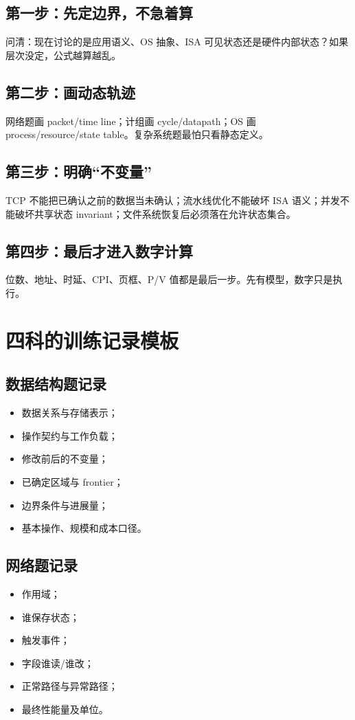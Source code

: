 \documentclass[11pt,a4paper,openany]{ctexbook}
\begin{document}
\subsection{第一步：先定边界，不急着算}
问清：现在讨论的是应用语义、OS 抽象、ISA 可见状态还是硬件内部状态？如果层次没定，公式越算越乱。

\subsection{第二步：画动态轨迹}
网络题画 packet/time line；计组画 cycle/datapath；OS 画 process/resource/state table。复杂系统题最怕只看静态定义。

\subsection{第三步：明确“不变量”}
TCP 不能把已确认之前的数据当未确认；流水线优化不能破坏 ISA 语义；并发不能破坏共享状态 invariant；文件系统恢复后必须落在允许状态集合。

\subsection{第四步：最后才进入数字计算}
位数、地址、时延、CPI、页框、P/V 值都是最后一步。先有模型，数字只是执行。

\section{四科的训练记录模板}

\subsection{数据结构题记录}
\begin{itemize}
  \item 数据关系与存储表示；
  \item 操作契约与工作负载；
  \item 修改前后的不变量；
  \item 已确定区域与 frontier；
  \item 边界条件与进展量；
  \item 基本操作、规模和成本口径。
\end{itemize}

\subsection{网络题记录}
\begin{itemize}
  \item 作用域；
  \item 谁保存状态；
  \item 触发事件；
  \item 字段谁读/谁改；
  \item 正常路径与异常路径；
  \item 最终性能量及单位。
\end{itemize}
\end{document}

